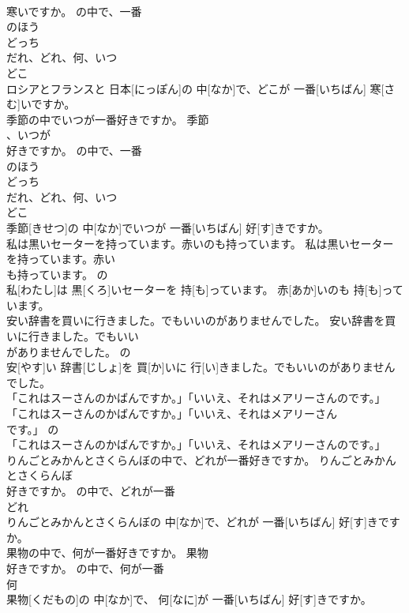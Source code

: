 \documentclass[8pt]{extreport}
\begin{document}
\begin{CJK}{UTF8}{min}
\\	寒いですか。	の中で、一番	
\\	のほう 
\\	どっち 
\\	だれ、どれ、何、いつ 
\\	どこ 
\\	ロシアとフランスと 日本[にっぽん]の 中[なか]で、どこが 一番[いちばん] 寒[さむ]いですか。	
\\	季節の中でいつが一番好きですか。	季節
\\	、いつが
\\	好きですか。	の中で、一番	
\\	のほう 
\\	どっち 
\\	だれ、どれ、何、いつ 
\\	どこ 
\\	季節[きせつ]の 中[なか]でいつが 一番[いちばん] 好[す]きですか。	
\\	私は黒いセーターを持っています。赤いのも持っています。	私は黒いセーターを持っています。赤い
\\	も持っています。	の	
\\	私[わたし]は 黒[くろ]いセーターを 持[も]っています。 赤[あか]いのも 持[も]っています。	
\\	安い辞書を買いに行きました。でもいいのがありませんでした。	安い辞書を買いに行きました。でもいい
\\	がありませんでした。	の	
\\	安[やす]い 辞書[じしょ]を 買[か]いに 行[い]きました。でもいいのがありませんでした。	
\\	「これはスーさんのかばんですか。」「いいえ、それはメアリーさんのです。」	「これはスーさんのかばんですか。」「いいえ、それはメアリーさん
\\	です。」	の	
\\	「これはスーさんのかばんですか。」「いいえ、それはメアリーさんのです。」	
\\	りんごとみかんとさくらんぼの中で、どれが一番好きですか。	りんごとみかんとさくらんぼ
\\	好きですか。	の中で、どれが一番	
\\	どれ 
\\	りんごとみかんとさくらんぼの 中[なか]で、どれが 一番[いちばん] 好[す]きですか。	
\\	果物の中で、何が一番好きですか。	果物
\\	好きですか。	の中で、何が一番	
\\	何 
\\	果物[くだもの]の 中[なか]で、 何[なに]が 一番[いちばん] 好[す]きですか。	

\end{CJK}
\end{document}
